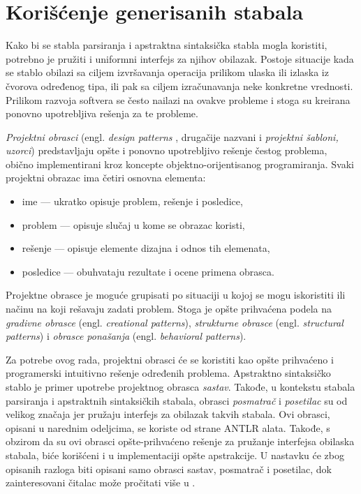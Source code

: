 \section{Korišćenje generisanih stabala}
\label{sec:DesignPatterns}

Kako bi se stabla parsiranja i apstraktna sintaksička stabla mogla koristiti, potrebno je pružiti i uniformni interfejs za njihov obilazak. Postoje situacije kada se stablo obilazi sa ciljem izvršavanja operacija prilikom ulaska ili izlaska iz čvorova određenog tipa, ili pak sa ciljem izračunavanja neke konkretne vrednosti. Prilikom razvoja softvera se često nailazi na ovakve probleme i stoga su kreirana ponovno upotrebljiva rešenja za te probleme. 

\emph{Projektni obrasci} (engl. \emph{design patterns} \cite{DesignPatternsBook}, drugačije nazvani i \emph{projektni šabloni, uzorci}) predstavljaju opšte i ponovno upotrebljivo rešenje čestog problema, obično implementirani kroz koncepte objektno-orijentisanog programiranja. Svaki projektni obrazac ima četiri osnovna elementa:
\begin{itemize}
    \item ime --- ukratko opisuje problem, rešenje i posledice,
    \item problem --- opisuje slučaj u kome se obrazac koristi,
    \item rešenje --- opisuje elemente dizajna i odnos tih elemenata,
    \item posledice --- obuhvataju rezultate i ocene primena obrasca.
\end{itemize}

Projektne obrasce je moguće grupisati po situaciji u kojoj se mogu iskoristiti ili načinu na koji rešavaju zadati problem. Stoga je opšte prihvaćena podela na \emph{gradivne obrasce} (engl. \emph{creational patterns}), \emph{strukturne obrasce} (engl. \emph{structural patterns}) i \emph{obrasce ponašanja} (engl. \emph{behavioral patterns}).

Za potrebe ovog rada, projektni obrasci će se koristiti kao opšte prihvaćeno i programerski intuitivno rešenje određenih problema. Apstraktno sintaksičko stablo je primer upotrebe projektnog obrasca \emph{sastav}. Takođe, u kontekstu stabala parsiranja i apstraktnih sintaksičkih stabala, obrasci \emph{posmatrač} i \emph{posetilac} su od velikog značaja jer pružaju interfejs za obilazak takvih stabala. Ovi obrasci, opisani u narednim odeljcima, se koriste od strane ANTLR alata. Takođe, s obzirom da su ovi obrasci opšte-prihvaćeno rešenje za pružanje interfejsa obilaska stabala, biće korišćeni i u implementaciji opšte apstrakcije. U nastavku će zbog opisanih razloga biti opisani samo obrasci sastav, posmatrač i posetilac, dok zainteresovani čitalac može pročitati više u \cite{DesignPatternsBook}.

